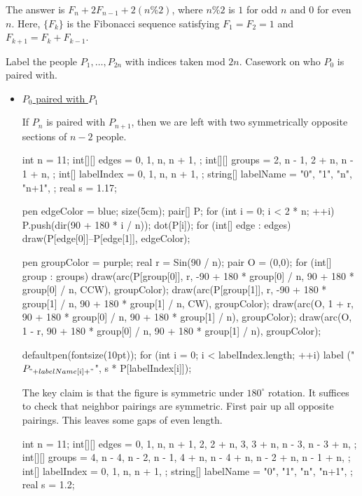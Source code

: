 The answer is $\boxed{F_n+2F_{n-1}+2(n\%2)}$, where $n\%2$ is $1$ for odd $n$ and $0$ for even $n$. Here, $\{F_k\}$ is the Fibonacci sequence satisfying $F_1=F_2=1$ and $F_{k+1}=F_k+F_{k-1}$.

Label the people $P_1,\ldots,P_{2n}$ with indices taken mod $2n$. Casework on who $P_0$ is paired with.
\begin{itemize}
	\item \underline{$P_0$ paired with $P_1$}
	
	If $P_n$ is paired with $P_{n+1}$, then we are left with two symmetrically opposite sections of $n-2$ people.
	\begin{center}
		\begin{asy}
			int n = 11;
			int[][] edges = {
				{0, 1},
				{n, n + 1},
			};
			int[][] groups = {
				{2, n - 1},
				{2 + n, n - 1 + n},
			};
			int[] labelIndex = {
				0,
				1,
				n,
				n + 1,
			};
			string[] labelName = {
				"0",
				"1",
				"n",
				"n+1",
			};
			real s = 1.17;
			
			pen edgeColor = blue;
			size(5cm);
			pair[] P;
			for (int i = 0; i < 2 * n; ++i) {
				P.push(dir(90 + 180 * i / n));
				dot(P[i]);
			}
			for (int[] edge : edges) draw(P[edge[0]]--P[edge[1]], edgeColor);
			
			pen groupColor = purple;
			real r = Sin(90 / n);
			pair O = (0,0);
			for (int[] group : groups) {
				draw(arc(P[group[0]], r, -90 + 180 * group[0] / n, 90 + 180 * group[0] / n, CCW), groupColor);
				draw(arc(P[group[1]], r, -90 + 180 * group[1] / n, 90 + 180 * group[1] / n, CW), groupColor);
				draw(arc(O, 1 + r, 90 + 180 * group[0] / n, 90 + 180 * group[1] / n), groupColor);
				draw(arc(O, 1 - r, 90 + 180 * group[0] / n, 90 + 180 * group[1] / n), groupColor);
			}
			
			defaultpen(fontsize(10pt));
			for (int i = 0; i < labelIndex.length; ++i) label ("$P_{" + labelName[i] + "}$", s * P[labelIndex[i]]);
		\end{asy}
	\end{center}
	The key claim is that the figure is symmetric under $180^\circ$ rotation. It suffices to check that neighbor pairings are symmetric. First pair up all opposite pairings. This leaves some gaps of even length.
	\begin{center}
		\begin{asy}
			int n = 11;
			int[][] edges = {
				{0, 1},
				{n, n + 1},
				{2, 2 + n},
				{3, 3 + n},
				{n - 3, n - 3 + n},
			};
			int[][] groups = {
				{4, n - 4},
				{n - 2, n - 1},
				{4 + n, n - 4 + n},
				{n - 2 + n, n - 1 + n},
			};
			int[] labelIndex = {
				0,
				1,
				n,
				n + 1,
			};
			string[] labelName = {
				"0",
				"1",
				"n",
				"n+1",
			};
			real s = 1.2;
			

\end{asy}
\end{center}
\end{itemize}
